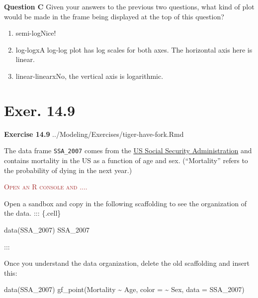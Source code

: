 \documentclass[
  letterpaper,
  DIV=11,
  numbers=noendperiod,
  oneside]{article}
\newenvironment{Shaded}{\begin{snugshade}}{\end{snugshade}}
\newcommand{\AttributeTok}[1]{\textcolor[rgb]{0.40,0.45,0.13}{#1}}
\newcommand{\FunctionTok}[1]{\textcolor[rgb]{0.28,0.35,0.67}{#1}}
\newcommand{\NormalTok}[1]{\textcolor[rgb]{0.00,0.23,0.31}{#1}}
\newcommand{\SpecialCharTok}[1]{\textcolor[rgb]{0.37,0.37,0.37}{#1}}
\providecommand{\tightlist}{%
  \setlength{\itemsep}{0pt}\setlength{\parskip}{0pt}}\usepackage{longtable,booktabs,array}
\newenvironment{scaffolding}%
{%
\textcolor{brown}{\hrulefill}%
  \par\vspace{.3\baselineskip}%
  \textcolor{brown}{\scshape Open an R console and ....}%
  \par\vspace{\baselineskip}%
}%
{\textcolor{brown}{\hrulefill}}
\begin{document}
\begin{multicols}{2}
\textbf{Question C} Given your answers to the previous two questions,
what kind of plot would be made in the frame being displayed at the top
of this question?

\begin{enumerate}
\def\labelenumi{\roman{enumi}.}
\tightlist
\item
  {semi-log{Nice!~}}\\
\item
  {log-log{xA log-log plot has log scales for both axes. The
  horizontal axis here is linear.}}\\
\item
  {linear-linear{xNo, the vertical axis is logarithmic.}}
\end{enumerate}

\hypertarget{exer.-14.9}{%
\section*{Exer. 14.9}\label{exer.-14.9}}

\textbf{Exercise 14.9} ../Modeling/Exercises/tiger-have-fork.Rmd

The data frame \texttt{SSA\_2007} comes from the
\href{https://www.ssa.gov/oact/STATS/table4c6.html}{US Social Security
Administration} and contains mortality in the US as a function of age
and sex. (``Mortality'' refers to the probability of dying in the next
year.)

\begin{scaffolding}

Open a sandbox and copy in the following scaffolding to see the
organization of the data. ::: \{.cell\}

\begin{Shaded}
\begin{Highlighting}[]
\FunctionTok{data}\NormalTok{(SSA\_2007)}
\NormalTok{SSA\_2007}
\end{Highlighting}
\end{Shaded}

\end{scaffolding}

:::

Once you understand the data organization, delete the old scaffolding
and insert this:

\begin{Shaded}
\begin{Highlighting}[]
\FunctionTok{data}\NormalTok{(SSA\_2007)}
\FunctionTok{gf\_point}\NormalTok{(Mortality }\SpecialCharTok{\textasciitilde{}}\NormalTok{ Age, }\AttributeTok{color =} \SpecialCharTok{\textasciitilde{}}\NormalTok{ Sex, }\AttributeTok{data =}\NormalTok{ SSA\_2007)}
\end{Highlighting}
\end{Shaded}


\end{multicols}
\end{document}
